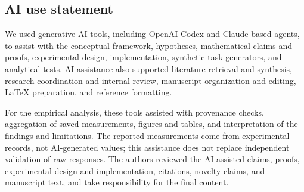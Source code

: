 \subsection*{AI use statement}

We used generative AI tools, including OpenAI Codex and Claude-based agents,
to assist with the conceptual framework, hypotheses, mathematical claims and
proofs, experimental design, implementation, synthetic-task generators, and
analytical tests. AI assistance also supported literature retrieval and
synthesis, research coordination and internal review, manuscript organization
and editing, LaTeX preparation, and reference formatting.

For the empirical analysis, these tools assisted with provenance checks,
aggregation of saved measurements, figures and tables, and interpretation
of the findings and limitations. The reported measurements come from
experimental records, not AI-generated values; this assistance does not replace
independent validation of raw responses. The authors reviewed the AI-assisted
claims, proofs, experimental design and implementation, citations, novelty
claims, and manuscript text, and take responsibility for the final content.
